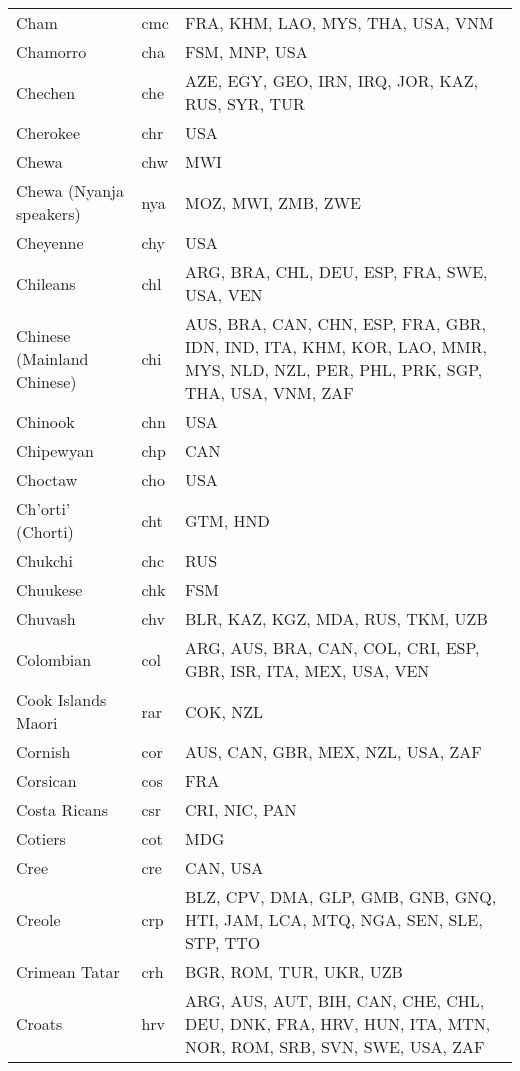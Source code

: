 \documentclass[12pt]{article}
\begin{document}
\begin{center}
\begin{longtable}{|p{7cm}|p{1cm}|p{7cm}|}
Cham 	&	cmc 	&	FRA, KHM, LAO, MYS, THA, USA, VNM	\\	\cline{1-3}
Chamorro	&	cha 	&	FSM, MNP, USA	\\	\cline{1-3}
Chechen	&	che 	&	AZE, EGY, GEO, IRN, IRQ, JOR, KAZ, RUS, SYR, TUR	\\	\cline{1-3}
Cherokee	&	chr 	&	USA	\\	\cline{1-3}
Chewa	&	chw	&	MWI	\\	\cline{1-3}
Chewa (Nyanja speakers)	&	nya 	&	MOZ, MWI, ZMB, ZWE	\\	\cline{1-3}
Cheyenne	&	chy 	&	USA	\\	\cline{1-3}
Chileans	&	chl	&	ARG, BRA, CHL, DEU, ESP, FRA, SWE, USA, VEN	\\	\cline{1-3}
Chinese (Mainland Chinese)	&	chi	&	AUS, BRA, CAN, CHN, ESP, FRA, GBR, IDN, IND, ITA, KHM, KOR, LAO, MMR, MYS, NLD, NZL, PER, PHL, PRK, SGP, THA, USA, VNM, ZAF	\\	\cline{1-3}
Chinook	&	chn 	&	USA	\\	\cline{1-3}
Chipewyan	&	chp 	&	CAN	\\	\cline{1-3}
Choctaw	&	cho 	&	USA	\\	\cline{1-3}
Ch'orti' (Chorti)	&	cht	&	GTM, HND	\\	\cline{1-3}
Chukchi	&	chc	&	RUS	\\	\cline{1-3}
Chuukese	&	chk 	&	FSM	\\	\cline{1-3}
Chuvash	&	chv 	&	BLR, KAZ, KGZ, MDA, RUS, TKM, UZB	\\	\cline{1-3}
Colombian	&	col	&	ARG, AUS, BRA, CAN, COL, CRI, ESP, GBR, ISR, ITA, MEX, USA, VEN	\\	\cline{1-3}
Cook Islands Maori	&	rar 	&	COK, NZL	\\	\cline{1-3}
Cornish	&	cor 	&	AUS, CAN, GBR, MEX, NZL, USA, ZAF	\\	\cline{1-3}
Corsican	&	cos 	&	FRA	\\	\cline{1-3}
Costa Ricans	&	csr	&	CRI, NIC, PAN	\\	\cline{1-3}
Cotiers	&	cot	&	MDG	\\	\cline{1-3}
Cree	&	cre 	&	CAN, USA	\\	\cline{1-3}
Creole	&	crp 	&	BLZ, CPV, DMA, GLP, GMB, GNB, GNQ, HTI, JAM, LCA, MTQ, NGA, SEN, SLE, STP, TTO	\\	\cline{1-3}
Crimean Tatar	&	crh 	&	BGR, ROM, TUR, UKR, UZB	\\	\cline{1-3}
Croats	&	hrv 	&	ARG, AUS, AUT, BIH, CAN, CHE, CHL, DEU, DNK, FRA, HRV, HUN, ITA, MTN, NOR, ROM, SRB, SVN, SWE, USA, ZAF	\\	\cline{1-3}

\end{longtable}
\end{center}
\end{document}

